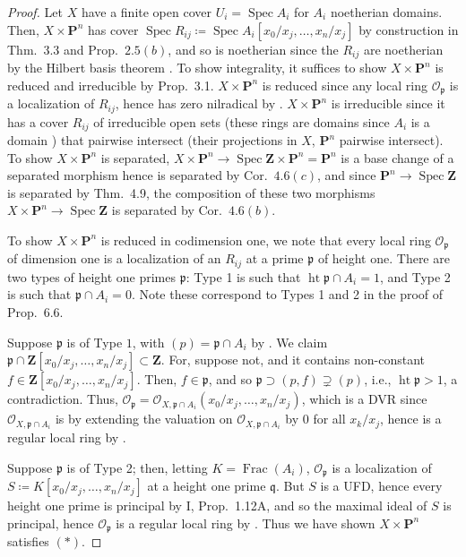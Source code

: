 \documentclass[12pt,letterpaper]{article}
\theoremstyle{definition}
\theoremstyle{remark}
\numberwithin{equation}{section}
\numberwithin{figure}{problem}
\DeclareMathOperator{\Spec}{Spec}
\DeclareMathOperator{\Ht}{ht}
\DeclareMathOperator{\Frac}{Frac}
\newcommand{\OO}{\mathcal{O}}
\begin{document}
\begin{proof}
  Let $X$ have a finite open cover $U_i = \Spec A_i$ for $A_i$ noetherian domains. Then, $X \times \mathbf{P}^n$ has cover $\Spec R_{ij} \coloneqq \Spec A_i[x_0/x_j,\ldots,x_n/x_j]$ by construction in Thm.~3.3 and Prop.~$2.5(b)$, and so is noetherian since the $R_{ij}$ are noetherian by the Hilbert basis theorem \cite[Thm.~7.5]{AM69}. To show integrality, it suffices to show $X \times \mathbf{P}^n$ is reduced and irreducible by Prop.~3.1. $X \times \mathbf{P}^n$ is reduced since any local ring $\OO_\mathfrak{p}$ is a localization of $R_{ij}$, hence has zero nilradical by \cite[Cor.~3.12]{AM69}. $X \times \mathbf{P}^n$ is irreducible since it has a cover $R_{ij}$ of irreducible open sets (these rings are domains since $A_i$ is a domain \cite[Prop.~7.2.4]{DF04}) that pairwise intersect (their projections in $X$, $\mathbf{P}^n$ pairwise intersect). To show $X \times \mathbf{P}^n$ is separated, $X \times \mathbf{P}^n \to \Spec \mathbf{Z} \times \mathbf{P}^n = \mathbf{P}^n$ is a base change of a separated morphism hence is separated by Cor.~$4.6(c)$, and since $\mathbf{P}^n \to \Spec \mathbf{Z}$ is separated by Thm.~4.9, the composition of these two morphisms $X \times \mathbf{P}^n \to \Spec \mathbf{Z}$ is separated by Cor.~$4.6(b)$.
  \par To show $X \times \mathbf{P}^n$ is reduced in codimension one, we note that every local ring $\OO_\mathfrak{p}$ of dimension one is a localization of an $R_{ij}$ at a prime $\mathfrak{p}$ of height one. There are two types of height one primes $\mathfrak{p}$: Type 1 is such that $\Ht \mathfrak{p} \cap A_i = 1$, and Type 2 is such that $\mathfrak{p} \cap A_i = 0$. Note these correspond to Types 1 and 2 in the proof of Prop.~6.6.
  \par Suppose $\mathfrak{p}$ is of Type $1$, with $(p) = \mathfrak{p} \cap A_i$ by \cite[Prop.~9.2]{AM69}. We claim $\mathfrak{p} \cap \mathbf{Z}[x_0/x_j,\ldots,x_n/x_j] \subset \mathbf{Z}$. For, suppose not, and it contains non-constant $f \in \mathbf{Z}[x_0/x_j,\ldots,x_n/x_j]$. Then, $f \in \mathfrak{p}$, and so $\mathfrak{p} \supset (p,f) \supsetneq (p)$, i.e., $\Ht \mathfrak{p} > 1$, a contradiction. Thus, $\OO_{\mathfrak{p}} = \OO_{X,\mathfrak{p} \cap A_i}(x_0/x_j,\ldots,x_n/x_j)$, which is a DVR since $\OO_{X,\mathfrak{p} \cap A_i}$ is by extending the valuation on $\OO_{X,\mathfrak{p} \cap A_i}$ by $0$ for all $x_k/x_j$, hence is a regular local ring by \cite[Prop.~9.2]{AM69}.
  \par Suppose $\mathfrak{p}$ is of Type 2; then, letting $K = \Frac(A_i)$, $\OO_{\mathfrak{p}}$ is a localization of $S \coloneqq K[x_0/x_j,\ldots,x_n/x_j]$ at a height one prime $\mathfrak{q}$. But $S$ is a UFD, hence every height one prime is principal by I, Prop.~1.12A, and so the maximal ideal of $S$ is principal, hence $\OO_{\mathfrak{p}}$ is a regular local ring by \cite[Prop.~9.2]{AM69}. Thus we have shown $X \times \mathbf{P}^n$ satisfies $(*)$.

\end{proof}
\end{document}
